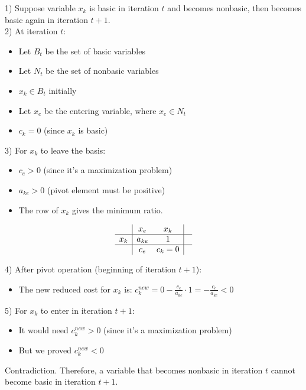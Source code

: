 \documentclass{article}
\begin{document}
1) Suppose variable $x_k$ is basic in iteration $t$ and becomes nonbasic, then becomes basic again in iteration $t+1$. \\

2) At iteration $t$:
    \begin{itemize}
    \item Let $B_t$ be the set of basic variables
    \item Let $N_t$ be the set of nonbasic variables
    \item $x_k \in B_t$ initially
    \item Let $x_e$ be the entering variable, where $x_e \in N_t$
    \item $c_k = 0$ (since $x_k$ is basic)
    \end{itemize}

3) For $x_k$ to leave the basis:
    \begin{itemize}
    \item ${c}_e > 0$ (since it's a maximization problem)
    \item $a_{ke} > 0$ (pivot element must be positive)
    \item The row of $x_k$ gives the minimum ratio.
    \end{itemize}

\[
\begin{array}{c|cc|c}
    & x_e & x_k & \\
\hline
    x_k & a_{ke} & 1 & \\
    \hline
    & c_e & c_k = 0 &  \\
\end{array}
\]

4) After pivot operation (beginning of iteration $t+1$):
    \begin{itemize}
    \item The new reduced cost for $x_k$ is:
     ${c}_k^{new} = 0 - \frac{{c}_e}{a_{ke}} \cdot 1 = - \frac{{c}_e}{a_{ke}} < 0$
    \end{itemize}

5) For $x_k$ to enter in iteration $t+1$:
    \begin{itemize}
    \item It would need ${c}_k^{new} > 0$ (since it's a maximization problem)
    \item But we proved ${c}_k^{new} < 0$
    \end{itemize}

Contradiction. Therefore, a variable that becomes nonbasic in iteration $t$ cannot become basic in iteration $t+1$.
\end{document}
